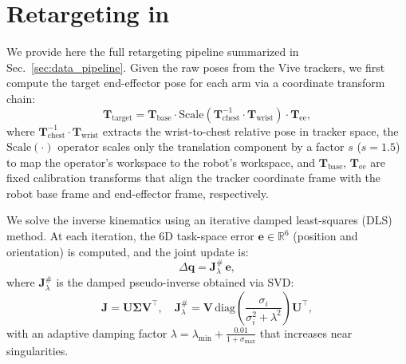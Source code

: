 \section{Retargeting in \our} 
\label{sec:retargeting_appendix}
We provide here the full retargeting pipeline summarized in Sec.~\ref{sec:data_pipeline}.
Given the raw poses from the Vive trackers, we first compute the target end-effector pose for each arm via a coordinate transform chain:    
\begin{equation}                                                                       \mathbf{T}_{\text{target}} = \mathbf{T}_{\text{base}} \cdot \text{Scale}(\mathbf{T}_{\text{chest}}^{-1} \cdot \mathbf{T}_{\text{wrist}}) \cdot \mathbf{T}_{\text{ee}},
\end{equation}
where $\mathbf{T}_{\text{chest}}^{-1} \cdot \mathbf{T}_{\text{wrist}}$ extracts the wrist-to-chest relative pose in tracker space, the $\text{Scale}(\cdot)$ operator scales only the translation component by a factor $s$ (\eg $s=1.5$) to map the operator's workspace to the robot's workspace, and $\mathbf{T}_{\text{base}}$, $\mathbf{T}_{\text{ee}}$ are fixed calibration transforms that align the tracker coordinate frame with the robot base frame and end-effector frame, respectively.       

We solve the inverse kinematics using an iterative damped least-squares (DLS) method. At each iteration, the 6D task-space error $\mathbf{e} \in \mathbb{R}^6$ (position and orientation) is computed, and the joint update is:                        
\begin{equation}                                                                       \Delta \mathbf{q} = \mathbf{J}^{\#}_{\lambda} \, \mathbf{e},                           \end{equation}                                                                         where $\mathbf{J}^{\#}_{\lambda}$ is the damped pseudo-inverse obtained via SVD:       \begin{equation}                                                                       \mathbf{J} = \mathbf{U} \boldsymbol{\Sigma} \mathbf{V}^\top, \quad                     \mathbf{J}^{\#}_{\lambda} = \mathbf{V} \, \text{diag}\!\left(\frac{\sigma_i}{\sigma_i^2 + \lambda^2}\right) \mathbf{U}^\top,                                       \end{equation}                                                                         with an adaptive damping factor $\lambda = \lambda_{\min} + \frac{0.01}{1 + \sigma_{\max}}$ that increases near singularities.                                     

